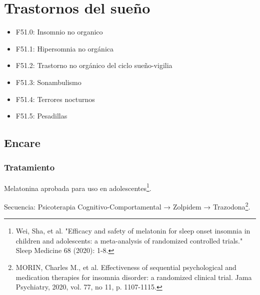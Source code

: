 \chapter*{Trastornos del sueño}
\begin{itemize}
    \item F51.0: Insomnio no organico
    \item F51.1: Hipersomnia no orgánica
    \item F51.2: Trastorno no orgánico del ciclo sueño-vigilia
    \item F51.3: Sonambulismo
    \item F51.4: Terrores nocturnos
    \item F51.5: Pesadillas
\end{itemize}
\section*{Encare}
\subsection*{Tratamiento}
Melatonina aprobada para uso en adolescentes\footnote{Wei, Sha, et al. "Efficacy and safety of melatonin for sleep onset insomnia in children and adolescents: a meta-analysis of randomized controlled trials." Sleep Medicine 68 (2020): 1-8.}.

Secuencia: Psicoterapia Cognitivo-Comportamental → Zolpidem → Trazodona\footnote{MORIN, Charles M., et al. Effectiveness of sequential psychological and medication therapies for insomnia disorder: a randomized clinical trial. Jama Psychiatry, 2020, vol. 77, no 11, p. 1107-1115.}.
